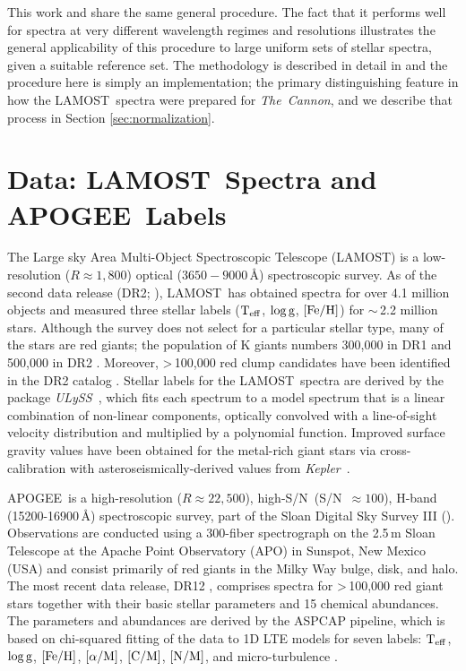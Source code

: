\documentclass[12pt, letterpaper, preprint]{aastex}
\newcommand{\tc}{\textsl{The~Cannon}}
\newcommand{\apogee}{APOGEE}
\newcommand{\lamost}{LAMOST}
\newcommand{\kepler}{\textsl{Kepler}}
\newcommand{\ulyss}{\textsl{ULySS}}
\newcommand{\teff}{\mbox{$\rm T_{eff}$}}
\newcommand{\feh}{\mbox{$\rm [Fe/H]$}}
\newcommand{\alpham}{\mbox{$\rm [\alpha/M]$}}
\newcommand{\logg}{\mbox{$\rm \log g$}}
\newcommand{\cm}{\mbox{$\rm [C/M]$}}
\newcommand{\nm}{\mbox{$\rm [N/M]$}}
\newcommand{\angstrom}{\mbox{\AA}}
\newcommand{\snr}{S/N}
\begin{document}
This work and \citet{Ness2015} share the same general procedure.
The fact that it performs well for spectra at very different wavelength regimes and resolutions illustrates the general applicability of this procedure to large uniform sets of stellar spectra, given a suitable reference set.
The methodology is described in detail in \citet{Ness2015} and the
procedure here is simply an implementation;
the primary distinguishing feature
in how the \lamost\ spectra were prepared for \tc,
and we describe that process in Section \ref{sec:normalization}.

\section{Data: \lamost\ Spectra and \apogee\ Labels}\label{sec:data}

The Large sky Area Multi-Object Spectroscopic Telescope (\lamost) 
is a low-resolution ($R\approx1,800$) optical ($3650-9000\,\angstrom$) spectroscopic survey.
As of the second data release (DR2; \citet{Luo2015}), \lamost\ has 
obtained spectra for over 4.1 million objects and 
measured three stellar labels (\teff, \logg, \feh) for
 $\sim\,$2.2 million stars. 
Although the survey does not select for
a particular stellar type, many of the stars
are red giants; the population of K giants
numbers 300,000 in DR1 and 500,000 in DR2
\citep{Liu2014}. 
Moreover, \textgreater\,100,000 red clump candidates have been identified in the DR2 catalog \citep{Wan2015}.
Stellar labels for the \lamost\ spectra 
are derived by
the package \ulyss\ \citep{Wu2011}, which fits each spectrum to a 
model spectrum that is a linear combination of non-linear components,
optically convolved with a line-of-sight velocity
distribution and multiplied by a polynomial function. 
Improved surface gravity values have been obtained for
the metal-rich giant stars via cross-calibration with asteroseismically-derived values from
\kepler\ \citep{Liu2015}.

\apogee\ is a high-resolution ($R\approx22,500$), high-\snr\ (\snr\ $\approx100$), H-band (15200-16900\,$\mbox{\AA}$) spectroscopic survey, part of the Sloan Digital Sky
Survey III (\citet{Majewski2015,Eisenstein2011}). 
Observations are conducted using a 300-fiber spectrograph
\citep{Wilson2010} on the 2.5\,m Sloan Telescope
\citep{Gunn2006} at the Apache Point Observatory (APO) in Sunspot, New Mexico (USA) and consist primarily of
red giants in the Milky Way bulge, disk, and halo.
The most recent data release, DR12 \citep{Alam2015, Holtzman2015},
comprises spectra for \textgreater\,100,000 red giant stars together with their basic stellar parameters and 15 chemical
abundances. 
The parameters and abundances are 
derived by the ASPCAP pipeline, which is based on chi-squared fitting of the data to 1D LTE models for seven labels: \teff, \logg, \feh, \alpham, \cm, \nm, and micro-turbulence \citep{GarciaPerez2015}. 
\end{document}
